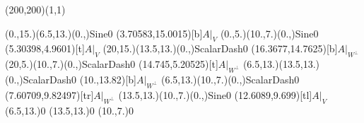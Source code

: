 \unitlength=1bp%

\begin{feynartspicture}(200,200)(1,1)

\FADiagram{}
\FAProp(0.,15.)(6.5,13.)(0.,){Sine}{0}
\FALabel(3.70583,15.0015)[b]{$A|_V$}
\FAProp(0.,5.)(10.,7.)(0.,){Sine}{0}
\FALabel(5.30398,4.9601)[t]{$A|_V$}
\FAProp(20,15.)(13.5,13.)(0.,){ScalarDash}{0}
\FALabel(16.3677,14.7625)[b]{$A|_{W^\perp}$}
\FAProp(20,5.)(10.,7.)(0.,){ScalarDash}{0}
\FALabel(14.745,5.20525)[t]{$A|_{W^\perp}$}
\FAProp(6.5,13.)(13.5,13.)(0.,){ScalarDash}{0}
\FALabel(10.,13.82)[b]{$A|_{W^\perp}$}
\FAProp(6.5,13.)(10.,7.)(0.,){ScalarDash}{0}
\FALabel(7.60709,9.82497)[tr]{$A|_{W^\perp}$}
\FAProp(13.5,13.)(10.,7.)(0.,){Sine}{0}
\FALabel(12.6089,9.699)[tl]{$A|_V$}
\FAVert(6.5,13.){0}
\FAVert(13.5,13.){0}
\FAVert(10.,7.){0}
\end{feynartspicture}


